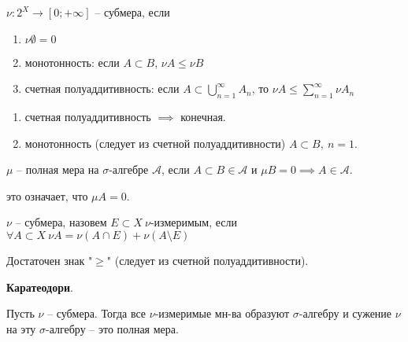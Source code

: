 \begin{definition}
    $\nu : 2^{X} \rightarrow [0; +\infty]$ -- субмера, если 

    \begin{enumerate}
        \item $\nu \emptyset = 0$
        \item монотонность: если $A \subset B$, $\nu A \leq \nu B$
        \item счетная полуаддитивность: если  $A \subset \bigcup_{n=1}^{\infty} A_n$, то $\nu A \leq \sum_{n=1}^{\infty} \nu A_n$
    \end{enumerate}
\end{definition}
\begin{remark}
    \begin{enumerate}
        \item счетная полуаддитивность $\implies$ конечная.
        \item монотонность (следует из счетной полуаддитивности) $A \subset B, \ n=1$.
    \end{enumerate}
\end{remark}

\begin{definition}
    $\mu$ -- полная мера на $\sigma$-алгебре $\mathcal{A}$, если $A \subset B \in \mathcal{A}$ и $\mu B = 0 \implies A \in \mathcal{A}$.
    
    \begin{remark}
        это означает, что $\mu A = 0$.
    \end{remark}
\end{definition}

\begin{definition}
    $\nu$ -- субмера, назовем $E \subset X \ \nu$-измеримым, если $\forall A \subset X \ \nu A = \nu (A \cap E) + \nu (A \setminus E)$


    \begin{remark}
        Достаточен знак "$\geq$" (следует из счетной полуаддитивности).
    \end{remark}
\end{definition}

\begin{theorem}
    \textbf{Каратеодори}.
    
    Пусть $\nu$ -- субмера. Тогда все $\nu$-измеримые мн-ва образуют $\sigma$-алгебру и сужение $\nu$ на эту $\sigma$-алгебру -- это полная мера.
\end{theorem}

